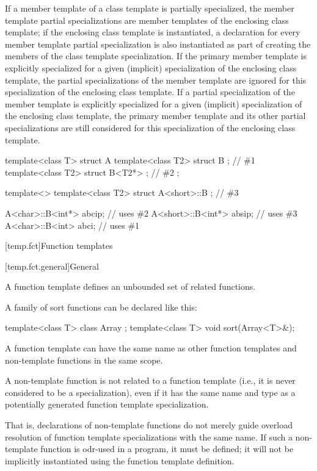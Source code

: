 \pnum
If a member template of a class template is partially specialized,
the member template partial specializations are member templates of
the enclosing class template;
if the enclosing class template is instantiated,
a declaration for every member template partial specialization is also
instantiated as part of creating the members of the class template
specialization.
If the primary member template is explicitly specialized for a given
(implicit) specialization of the enclosing class template,
the partial specializations of the member template are ignored for this
specialization of the enclosing class template.
If a partial specialization of the member template is explicitly specialized
for a given (implicit) specialization of the enclosing class template,
the primary member template and its other partial specializations are
still considered for this specialization of the enclosing class template.
\begin{example}
\begin{codeblock}
template<class T> struct A {
  template<class T2> struct B {};                               // \#1
  template<class T2> struct B<T2*> {};                          // \#2
};

template<> template<class T2> struct A<short>::B {};            // \#3

A<char>::B<int*>  abcip;                                        // uses \#2
A<short>::B<int*> absip;                                        // uses \#3
A<char>::B<int>  abci;                                          // uses \#1
\end{codeblock}
\end{example}

[temp.fct]{Function templates}

[temp.fct.general]{General}

\pnum
A function template defines an unbounded set of related functions.
\begin{example}
A family of sort functions can be declared like this:

\begin{codeblock}
template<class T> class Array { };
template<class T> void sort(Array<T>&);
\end{codeblock}
\end{example}

\pnum
\begin{note}
A function template can have the same name as other function templates
and non-template functions in the same scope.
\end{note}
A non-template function is not
related to a function template
(i.e., it is never considered to be a specialization),
even if it has the same name and type
as a potentially generated function template specialization.
\begin{footnote}
That is,
declarations of non-template functions do not merely guide
overload resolution of
function template specializations
with the same name.
If such a non-template function is odr-used in a program, it must be defined;
it will not be implicitly instantiated using the function template definition.
\end{footnote}

